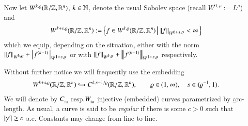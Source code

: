 Now let $W^{k,\rho}\rzd$, $k\in\N$, denote the usual Sobolev space
(recall $W^{0,\rho}:=L^\rho$) and
\[ W^{k+s,\rho}\rzd := \sett{f\in W^{k,\rho}\rzd}{\norm f_{\W[k+s,\rho]}<\infty} \]
which we equip, depending on the situation, either with the norm
$\norm f_{\W[k,\rho]} + \seminorm{f^{(k-1)}}_{\W[1+s,\rho]}$
or with $\norm f_{\W[k,\rho]} + \seminormv{f^{(k-1)}}_{\W[1+s,\rho]}$
respectively.

Without further notice we will frequently use the embedding
\begin{equation}\label{eq:Wembed}
 \W[k+s,\rho]\rzd\hookrightarrow C^{k,s-1/\rho}\rzd,
 \qquad \rho\in(1,\infty), \quad s\in(\rho^{-1},1).
\end{equation}
We will denote by $\Cia[]$ resp.\@ $\Wia[]$
\underline injective (embedded) curves parametrized by \underline arc-length.
As usual, a curve is said to be \emph{regular} if there is some $c>0$ such that $\abs\dg\ge c$ a.e.
Constants may change from line to line.

% 
% 
% 
